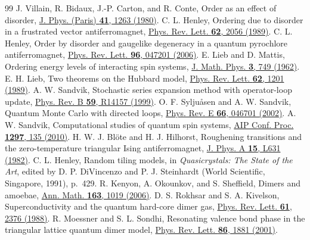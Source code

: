 \documentclass[aps,prb,twocolumn,superscriptaddress,floatfix]{revtex4-2}
\begin{document}
\clearpage
\begin{thebibliography}{99}
 J. Villain, R. Bidaux, J.-P. Carton, and R. Conte, Order as an effect of disorder, \href{https://doi.org/10.1051/jphys:0198000410110126300}{J. Phys. (Paris) \textbf{41}, 1263 (1980)}.
 C. L. Henley, Ordering due to disorder in a frustrated vector antiferromagnet, \href{https://doi.org/10.1103/PhysRevLett.62.2056}{Phys. Rev. Lett. \textbf{62}, 2056 (1989)}.
 C. L. Henley, Order by disorder and gaugelike degeneracy in a quantum pyrochlore antiferromagnet, \href{https://doi.org/10.1103/PhysRevLett.96.047201}{Phys. Rev. Lett. \textbf{96}, 047201 (2006)}.
 E. Lieb and D. Mattis, Ordering energy levels of interacting spin systems, \href{https://doi.org/10.1063/1.1724276}{J. Math. Phys. \textbf{3}, 749 (1962)}.
 E. H. Lieb, Two theorems on the Hubbard model, \href{https://doi.org/10.1103/PhysRevLett.62.1201}{Phys. Rev. Lett. \textbf{62}, 1201 (1989)}.
 A. W. Sandvik, Stochastic series expansion method with operator-loop update, \href{https://doi.org/10.1103/PhysRevB.59.R14157}{Phys. Rev. B \textbf{59}, R14157 (1999)}.
 O. F. Sylju\aa sen and A. W. Sandvik, Quantum Monte Carlo with directed loops, \href{https://doi.org/10.1103/PhysRevE.66.046701}{Phys. Rev. E \textbf{66}, 046701 (2002)}.
 A. W. Sandvik, Computational studies of quantum spin systems, \href{https://doi.org/10.1063/1.3518900}{AIP Conf. Proc. \textbf{1297}, 135 (2010)}.
 H. W. J. Bl\"ote and H. J. Hilhorst, Roughening transitions and the zero-temperature triangular Ising antiferromagnet, \href{https://doi.org/10.1088/0305-4470/15/11/011}{J. Phys. A \textbf{15}, L631 (1982)}.
 C. L. Henley, Random tiling models, in \textit{Quasicrystals: The State of the Art}, edited by D. P. DiVincenzo and P. J. Steinhardt (World Scientific, Singapore, 1991), p.~429.
 R. Kenyon, A. Okounkov, and S. Sheffield, Dimers and amoebae, \href{https://doi.org/10.4007/annals.2006.163.1019}{Ann. Math. \textbf{163}, 1019 (2006)}.
 D. S. Rokhsar and S. A. Kivelson, Superconductivity and the quantum hard-core dimer gas, \href{https://doi.org/10.1103/PhysRevLett.61.2376}{Phys. Rev. Lett. \textbf{61}, 2376 (1988)}.
 R. Moessner and S. L. Sondhi, Resonating valence bond phase in the triangular lattice quantum dimer model, \href{https://doi.org/10.1103/PhysRevLett.86.1881}{Phys. Rev. Lett. \textbf{86}, 1881 (2001)}.

\end{thebibliography}
\end{document}
